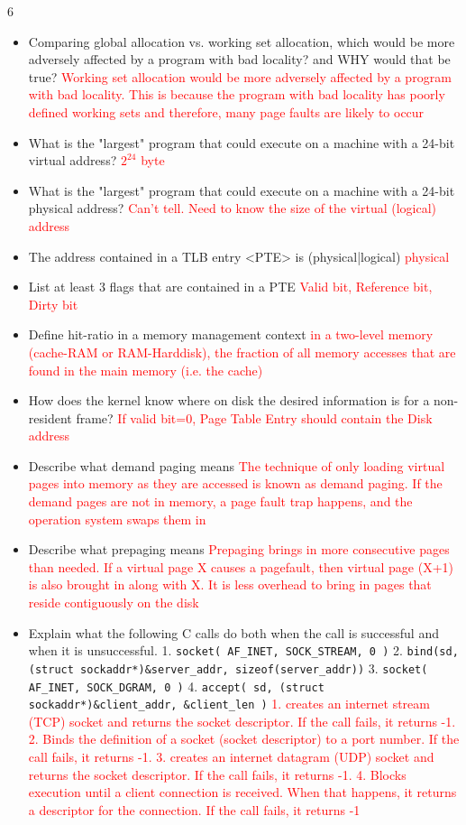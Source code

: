 \documentclass[9pt,landscape]{memoir}
\newcommand{\answer}[1]{\textcolor{red}{#1}}
\begin{document}
\begin{multicols}{6}
\begin{itemize}
    \item Comparing global allocation vs. working set allocation, which would be more adversely affected by a program with bad locality? and WHY would that be true?  \answer{Working set allocation would be more adversely affected by a program with bad locality. This is because the program with bad locality has poorly defined working sets and therefore, many page faults are likely to occur}
    \item What is the "largest" program that could execute on a machine with a 24-bit virtual address?  \answer{$2^{24}$ byte}
    \item What is the "largest" program that could execute on a machine with a 24-bit physical address?  \answer{Can't tell. Need to know the size of the virtual (logical) address}
    \item The address contained in a TLB entry <PTE> is (physical|logical) \answer{physical}
    \item List at least 3 flags that are contained in a PTE \answer{Valid bit, Reference bit, Dirty bit}
    \item Define hit-ratio in a memory management context \answer{in a two-level memory (cache-RAM or RAM-Harddisk), the fraction of all memory accesses that are found in the main memory (i.e. the cache)}
    \item How does the kernel know where on disk the desired information is for a non-resident frame?  \answer{If valid bit=0, Page Table Entry should contain the Disk address}
    \item Describe what demand paging means \answer{The technique of only loading virtual pages into memory as they are accessed is known as demand paging. If the demand pages are not in memory, a page fault trap happens, and the operation system swaps them in}
    \item Describe what prepaging means \answer{Prepaging brings in more consecutive pages than needed. If a virtual page X causes a pagefault, then virtual page (X+1) is also brought in along with X. It is less overhead to bring in pages that reside contiguously on the disk}
    \item Explain what the following C calls do both when the call is successful and when it is unsuccessful. 1. \texttt{socket( AF\_INET, SOCK\_STREAM, 0 )} 2. \texttt{bind(sd, (struct sockaddr*)\&server\_addr, sizeof(server\_addr))} 3. \texttt{socket( AF\_INET, SOCK\_DGRAM, 0 )} 4. \texttt{accept( sd, (struct sockaddr*)\&client\_addr, \&client\_len )} \answer{1. creates an internet stream (TCP) socket and returns the socket descriptor. If the call fails, it returns -1. 2. Binds the definition of a socket (socket descriptor) to a port number. If the call fails, it returns -1. 3. creates an internet datagram (UDP) socket and returns the socket descriptor. If the call fails, it returns -1. 4. Blocks execution until a client connection is received. When that happens, it returns a descriptor for the connection. If the call fails, it returns -1}

\end{itemize}
\end{multicols}
\end{document}
